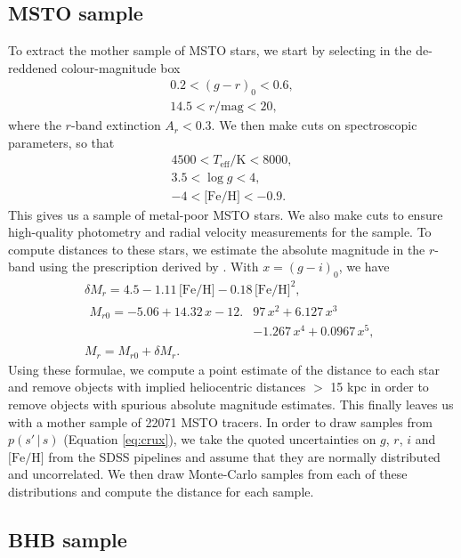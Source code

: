 \documentclass[useAMS,twocolumn,usenatbib]{mn2e}
\begin{document}
\subsection{MSTO sample}

To extract the mother sample of MSTO stars, we start by selecting in the de-reddened colour-magnitude box
%
\begin{gather}
0.2 < (g-r)_0 < 0.6, \nonumber \\
14.5 < r/\mathrm{mag} < 20,
\end{gather}
%
where the $r$-band extinction $A_r<0.3$. We then make cuts on spectroscopic parameters, so that
%
\begin{gather}
4500 < T_{\mathrm{eff}}/\mathrm{K} < 8000, \nonumber \\
3.5 < \log g < 4, \nonumber \\
-4 < \mathrm{\lbrack Fe/H \rbrack} < -0.9.
\end{gather}
% 
This gives us a sample of metal-poor MSTO stars. 
We also make cuts to ensure high-quality photometry and radial velocity measurements for the sample. 
To compute distances to these stars, we estimate the absolute magnitude in the $r$-band using the prescription derived by \cite{Iv08}. 
With $x=(g-i)_0$, we have
%
\begin{gather}
\delta M_r = 4.5 - 1.11\,\lbrack \mathrm{Fe/H} \rbrack -0.18\,\lbrack \mathrm{Fe/H} \rbrack^2, \nonumber \\
\begin{split}
M_{r0} = -5.06 + 14.32\,x - 12.{}&97\,x^2 + 6.127\,x^3 \nonumber \\
                    {}&- 1.267\,x^4 + 0.0967\,x^5,
\end{split}\\
M_r = M_{r0} + \delta M_r.
\end{gather}
% 
Using these formulae, we compute a point estimate of the distance to each star and remove objects with implied heliocentric distances $>$ 15 kpc in order to remove objects with spurious absolute magnitude estimates.
This finally leaves us with a mother sample of 22071 MSTO tracers. 
In order to draw samples from $p(s' \,|\, s)$ (Equation \ref{eq:crux}), we take the quoted uncertainties on $g$, $r$, $i$ and $\lbrack \mathrm{Fe/H} \rbrack$ from the SDSS pipelines and assume that they are normally distributed and uncorrelated. 
We then draw Monte-Carlo samples from each of these distributions and compute the distance for each sample.

\subsection{BHB sample}
\end{document}
